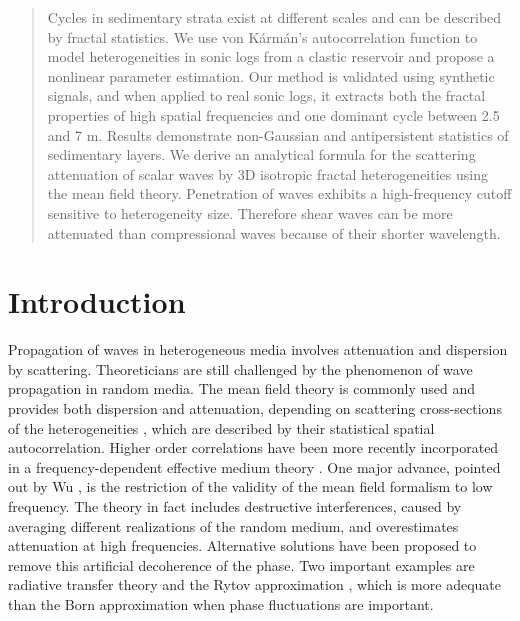 \begin{abstract}
Cycles in sedimentary strata exist at different scales
and can be described by fractal statistics.
We use von K\'arm\'an's autocorrelation function
to model heterogeneities in sonic logs from a clastic reservoir and
propose a nonlinear parameter estimation.
Our method is validated using synthetic signals,
and when applied to real sonic logs, it extracts both
the fractal properties of high spatial frequencies and one dominant cycle between 2.5 and 7 m.
Results demonstrate non-Gaussian and antipersistent statistics of sedimentary layers.
We derive an analytical formula for the scattering attenuation of scalar waves 
by 3D isotropic fractal heterogeneities using the mean field theory.
Penetration of waves exhibits a high-frequency cutoff sensitive to heterogeneity size.
Therefore shear waves can be more attenuated than compressional waves because of their shorter wavelength.
\end{abstract}


\section{Introduction}


Propagation of waves in heterogeneous media involves attenuation and dispersion by scattering.
Theoreticians are still challenged by the phenomenon of wave propagation in 
random media. The mean field theory \cite[]{Chernov_60,Karal_K64,Uscinski_77}
is commonly used and provides both dispersion and attenuation,
depending on scattering cross-sections of the heterogeneities \cite[]{Waterman_T61,Wu_A85,Kanaun_L08},
which are described by their statistical spatial autocorrelation.
Higher order correlations have been more recently incorporated 
in a frequency-dependent effective medium theory \cite[]{Chesnokov_KK98}.
One major advance, pointed out by Wu 
, is the restriction of the validity of the mean field formalism to low frequency.
The theory in fact includes destructive interferences, 
caused by averaging different realizations of the random medium,
and overestimates attenuation at high frequencies.
Alternative solutions have been proposed to remove this artificial decoherence of the phase.
Two important examples are radiative transfer theory \cite[]{Wu_93,Haney_WS05}
and the Rytov approximation \cite[]{Rytov_KT89}, which is more adequate than 
the Born approximation when phase fluctuations are important.


